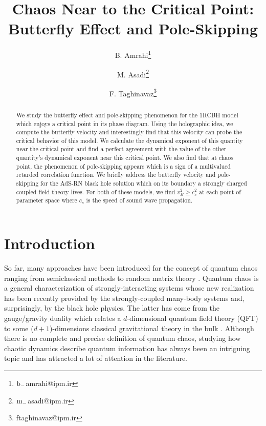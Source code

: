 \documentclass[preprintnumbers,aps,prd,longbibliography,nofootinbib,nobibnotes,amsmath,amssymb]{revtex4}
\begin{document}
%
\title{Chaos Near to the Critical Point: Butterfly Effect and Pole-Skipping}
%
\author{B. Amrahi\footnote{$\rm{b}_{-}$amrahi@ipm.ir}}
\author{M. Asadi\footnote{$\rm{m}_{-}$asadi@ipm.ir}}
\author{F. Taghinavaz\footnote{ftaghinavaz@ipm.ir}}

\begin{abstract}
We study the butterfly effect and pole-skipping phenomenon for the 1RCBH model which enjoys a critical point in its phase diagram. Using the holographic idea, we compute the butterfly velocity and interestingly find that this velocity can probe the critical behavior of this model. We  calculate the dynamical exponent of this quantity near the critical point and find a perfect agreement with the value of the other quantity's dynamical exponent near this critical point. 
We also find that at chaos point, the phenomenon of pole-skipping appears which is a sign of a multivalued retarded correlation function. We briefly address the butterfly velocity and pole-skipping for the AdS-RN black hole solution which on its boundary a strongly charged coupled field theory lives. For both of these models, we find $v_B^2 \geq c_s^2$ at each point of parameter space where $c_s$ is the speed of sound wave propagation. 	
\end{abstract}


\maketitle

\tableofcontents

\section{Introduction}
So far, many approaches have been introduced for the concept of quantum chaos ranging from semiclassical methods to random matrix theory \cite{Bohigas:1983er}. Quantum chaos is a general characterization of strongly-interacting systems whose new realization   has been recently provided by the strongly-coupled many-body systems and, surprisingly, by the black hole physics. The latter has come from the gauge/gravity duality which relates a $d$-dimensional quantum field theory (QFT) to some ($d+1$)-dimensions classical gravitational theory in the bulk  \cite{Maldacena:1997re, Gubser:1998bc, Witten:1998qj}. Although there is no complete and precise definition of quantum chaos, studying how chaotic dynamics describe  quantum information has always been an intriguing topic and has attracted a lot of attention in the literature.  
\end{document}
